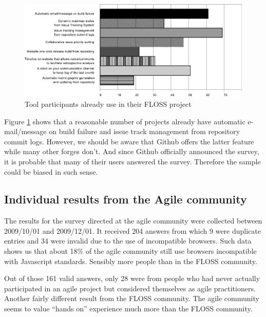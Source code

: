 \documentclass[lnbip]{svmultln}
\begin{document}
\begin{figure}[hbt]
  \centering
  \includegraphics[scale=.8]{floss-existingtools.pdf}
  \caption{Tool participants already use in their FLOSS project}
  \label{fig:floss-existingtools}
\end{figure}

Figure \ref{fig:floss-existingtools} shows that a reasonable number of
projects already have automatic e-mail/message on build failure and
issue track management from repository commit logs.  However, we
should be aware that Github offers the latter feature while many other
forges don't. And since Github officially announced the survey, it is
probable that many of their users answered the survey. Therefore the
sample could be biased in such sense.

\subsection{Individual results from the Agile community}
\label{subsec:agile-results}

The results for the survey directed at the agile community were
collected between 2009/10/01 and 2009/12/01. It received 204 answers
from which 9 were duplicate entries and 34 were invalid due to the use
of incompatible browsers. Such data shows us that about 18\% of the
agile community still use browsers incompatible with Javascript
standards. Sensibly more people than in the FLOSS community.

Out of those 161 valid answers, only 28 were from people who had never
actually participated in an agile project but considered themselves as
agile practitioners. Another fairly different result from the FLOSS
community. The agile community seems to value ``hands on'' experience
much more than the FLOSS community.
\end{document}
